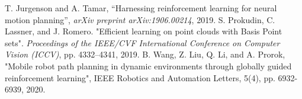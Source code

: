 \documentclass[conference]{IEEEtran}
\begin{document}
\begin{thebibliography}{00}
 T. Jurgenson and A. Tamar, ``Harnessing reinforcement learning for neural
motion planning'',  \textit{arXiv preprint arXiv:1906.00214}, 2019.
 S. Prokudin, C. Lassner, and J. Romero. "Efficient learning on point clouds with Basis Point sets". \textit{Proceedings of the IEEE/CVF International Conference on Computer Vision (ICCV)}, pp. 4332–4341, 2019.
 B. Wang, Z. Liu, Q. Li, and A. Prorok, "Mobile robot path planning in dynamic environments through globally guided reinforcement learning",  IEEE Robotics and Automation Letters, 5(4), pp. 6932-6939, 2020.
\end{thebibliography}
\end{document}
